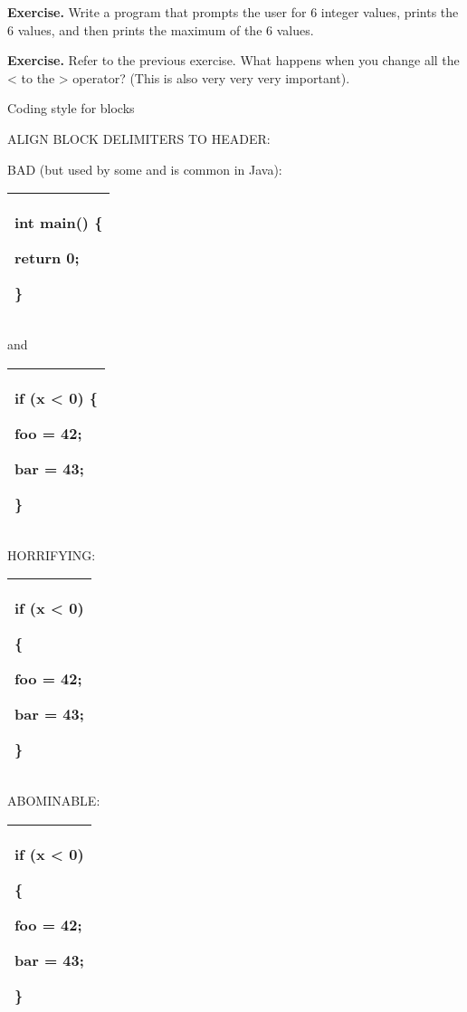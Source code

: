 \documentclass[
]{article}
\begin{document}
\textbf{Exercise.} Write a program that prompts the user for 6 integer
values, prints the 6 values, and then prints the maximum of the 6
values.

\textbf{Exercise.} Refer to the previous exercise. What happens when you
change all the \textless{} to the \textgreater{} operator? (This is also
very very very important).

Coding style for blocks

ALIGN BLOCK DELIMITERS TO HEADER:

BAD (but used by some and is common in Java):

\begin{longtable}[]{@{}l@{}}
\toprule
\endhead
\begin{minipage}[t]{0.97\columnwidth}\raggedright
int main() \{

return 0;

\} \strut
\end{minipage}\tabularnewline
\bottomrule
\end{longtable}

and

\begin{longtable}[]{@{}l@{}}
\toprule
\endhead
\begin{minipage}[t]{0.97\columnwidth}\raggedright
if (x \textless{} 0) \{

foo = 42;

bar = 43;

\}\strut
\end{minipage}\tabularnewline
\bottomrule
\end{longtable}

HORRIFYING:

\begin{longtable}[]{@{}l@{}}
\toprule
\endhead
\begin{minipage}[t]{0.97\columnwidth}\raggedright
if (x \textless{} 0)

\{

foo = 42;

bar = 43;

\}\strut
\end{minipage}\tabularnewline
\bottomrule
\end{longtable}

ABOMINABLE:

\begin{longtable}[]{@{}l@{}}
\toprule
\endhead
\begin{minipage}[t]{0.97\columnwidth}\raggedright
if (x \textless{} 0)

\{

foo = 42;

bar = 43;

\}\strut
\end{minipage}\tabularnewline
\bottomrule
\end{longtable}
\end{document}

